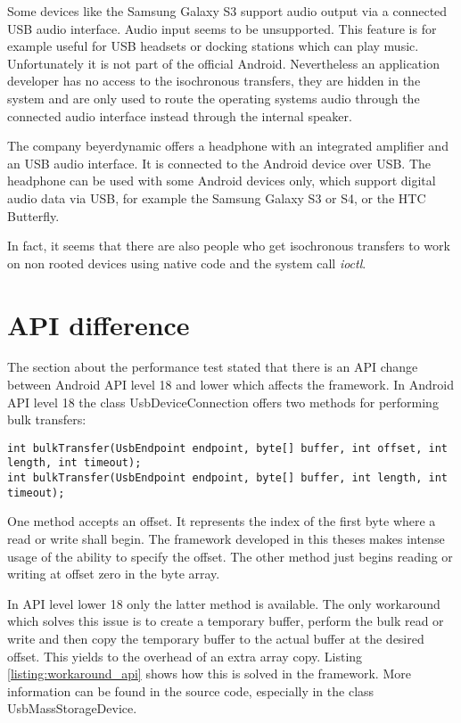 Some devices like the Samsung Galaxy S3 support audio output via a connected USB audio interface. Audio input seems to be unsupported. This feature is for example useful for USB headsets or docking stations which can play music. Unfortunately it is not part of the official Android. Nevertheless an application developer has no access to the isochronous transfers, they are hidden in the system and are only used to route the operating systems audio through the connected audio interface instead through the internal speaker.

The company beyerdynamic offers a headphone with an integrated amplifier and an USB audio interface. It is connected to the Android device over USB. The headphone can be used with some Android devices only, which support digital audio data via USB, for example the Samsung Galaxy S3 or S4, or the HTC Butterfly\cite{beyerdynamic}.

In fact, it seems that there are also people who get isochronous transfers to work on non rooted devices using native code and the system call \textit{ioctl}\cite{usb_audio_recorder, iso_stack}.

\chapter{API difference}
\label{chapter:api_diff}

The section about the performance test stated that there is an API change between Android API level 18 and lower which affects the framework. In Android API level 18 the class UsbDeviceConnection offers two methods for performing bulk transfers\cite{android_usb_dev_con}:

\lstset{language=Java}
\begin{lstlisting}[caption=Bulk transfers in UsbDeviceConnection, label=listing:wifi_connectg]
int bulkTransfer(UsbEndpoint endpoint, byte[] buffer, int offset, int length, int timeout);
int bulkTransfer(UsbEndpoint endpoint, byte[] buffer, int length, int timeout);
\end{lstlisting}

One method accepts an offset. It represents the index of the first byte where a read or write shall begin. The framework developed in this theses makes intense usage of the ability to specify the offset. The other method just begins reading or writing at offset zero in the byte array.

In API level lower 18 only the latter method is available. The only workaround which solves this issue is to create a temporary buffer, perform the bulk read or write and then copy the temporary buffer to the actual buffer at the desired offset. This yields to the overhead of an extra array copy. Listing \ref{listing:workaround_api} shows how this is solved in the framework. More information can be found in the source code, especially in the class \mbox{UsbMassStorageDevice}.

